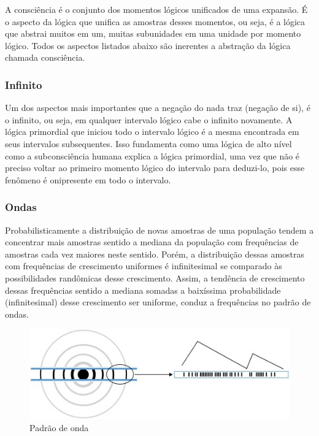 A consciência é o conjunto dos momentos lógicos unificados de uma expansão. É o aspecto da lógica que unifica as amostras desses momentos, ou seja, é a lógica que abstrai muitos em um, muitas subunidades em uma unidade por momento lógico. Todos os aspectos listados abaixo são inerentes a abstração da lógica chamada consciência.

\subsubsection{Infinito}
Um dos aspectos mais importantes que a negação do nada traz (negação de si), é o infinito, ou seja, em qualquer intervalo lógico cabe o infinito novamente. A lógica primordial que iniciou todo o intervalo lógico é a mesma encontrada em seus intervalos subsequentes. Isso fundamenta como uma lógica de alto nível como a subconsciência humana explica a lógica primordial, uma vez que não é preciso voltar ao primeiro momento lógico do intervalo para deduzi-lo, pois esse fenômeno é onipresente em todo o intervalo.

\subsubsection{Ondas}
Probabilisticamente a distribuição de novas amostras de uma população tendem a concentrar mais amostras sentido a mediana da população com frequências de amostras cada vez maiores neste sentido. Porém, a distribuição dessas amostras com frequências de crescimento uniformes é infinitesimal se comparado às possibilidades randômicas desse crescimento. Assim, a tendência de crescimento dessas frequências sentido a mediana somadas a baixíssima probabilidade (infinitesimal) desse crescimento ser uniforme, conduz a frequências no padrão de ondas.
	\begin{figure}[H]
	\caption{Padrão de onda}
	\label{fig:consciousness_waves}
	\centering
	\includegraphics[scale=1]{sections/images/consciousness_waves.jpg}
	\end{figure}

